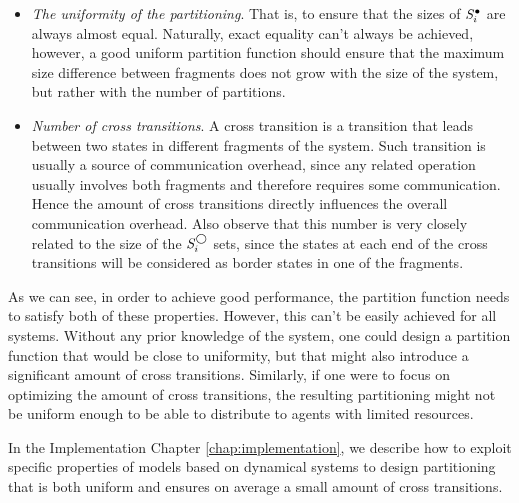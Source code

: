 \begin{itemize}
	\item  \emph{The uniformity of the partitioning}. That is, to ensure that the sizes of $\mathit{S}^\bullet_i$ are always almost equal. Naturally, exact equality can't always be achieved, however, a good uniform partition function should ensure that the maximum size difference between fragments does not grow with the size of the system, but rather with the number of partitions.
	\item \emph{Number of cross transitions}. A cross transition is a transition that leads between two states in different fragments of the system. Such transition is usually a source of communication overhead, since any related operation usually involves both fragments and therefore requires some communication. Hence the amount of cross transitions directly influences the overall communication overhead. Also observe that this number is very closely related to the size of the $\mathit{S}^\bigcirc_i$ sets, since the states at each end of the cross transitions will be considered as border states in one of the fragments.
\end{itemize}

As we can see, in order to achieve good performance, the partition function needs to satisfy both of these properties. However, this can't be easily achieved for all systems. Without any prior knowledge of the system, one could design a partition function that would be close to uniformity, but that might also introduce a significant amount of cross transitions. Similarly, if one were to focus on optimizing the amount of cross transitions, the resulting partitioning might not be uniform enough to be able to distribute to agents with limited resources.

In the Implementation Chapter \ref{chap:implementation}, we describe how to exploit specific properties of models based on dynamical systems to design partitioning that is both uniform and ensures on average a small amount of cross transitions.